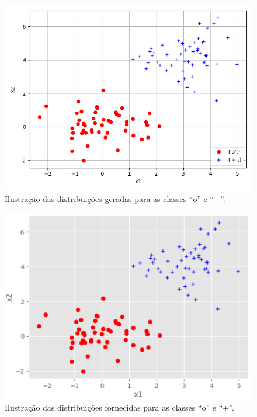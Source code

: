 \documentclass[12pt, a4paper]{mycoursepaper}
\begin{document}
\begin{figure}[H]
\centering
\includegraphics[width=0.45\paperwidth]{./myrandomdata.png}
\caption{Ilustração das distribuições geradas para as classes ``o'' e ``+''.}
\label{fig:myrandomdata}
\end{figure}

\begin{figure}[H]
\centering
\includegraphics[width=0.45\paperwidth]{./example.png}
\caption{Ilustração das distribuições fornecidas para as classes ``o'' e ``+''.}
\label{fig:example}
\end{figure}
\end{document}
